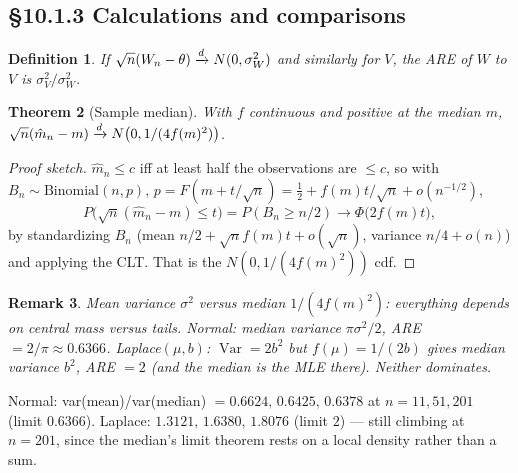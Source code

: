 \documentclass[11pt]{article}
\newtheorem{theorem}{Theorem}[section]
\newtheorem{definition}[theorem]{Definition}
\newtheorem{remark}[theorem]{Remark}
\DeclareMathOperator{\Var}{Var}\DeclareMathOperator{\E}{E}
\begin{document}
\subsection{\S10.1.3 Calculations and comparisons}
\begin{definition}
If $\sqrt n(W_n-\theta)\xrightarrow{d} N(0,\sigma_W^2)$ and similarly for $V$, the ARE of $W$ to $V$ is $\sigma_V^2/\sigma_W^2$.
\end{definition}
\begin{theorem}[Sample median]
With $f$ continuous and positive at the median $m$, $\sqrt n(\hat m_n-m)\xrightarrow{d} N\big(0,1/(4f(m)^2)\big)$.
\end{theorem}
\begin{proof}[Proof sketch]
$\hat m_n\le c$ iff at least half the observations are $\le c$, so with $B_n\sim\mathrm{Binomial}(n,p)$, $p=F(m+t/\sqrt n)=\frac12+f(m)t/\sqrt n+o(n^{-1/2})$,
\[P\big(\sqrt n(\hat m_n-m)\le t\big)=P(B_n\ge n/2)\to\Phi\big(2f(m)t\big),\]
by standardizing $B_n$ (mean $n/2+\sqrt nf(m)t+o(\sqrt n)$, variance $n/4+o(n)$) and applying the CLT. That is the $N(0,1/(4f(m)^2))$ cdf.
\end{proof}
\begin{remark}
Mean variance $\sigma^2$ versus median $1/(4f(m)^2)$: everything depends on central mass versus tails. Normal: median variance $\pi\sigma^2/2$, ARE $=2/\pi\approx0.6366$. Laplace$(\mu,b)$: $\Var=2b^2$ but $f(\mu)=1/(2b)$ gives median variance $b^2$, ARE $=2$ (and the median is the MLE there). Neither dominates.
\end{remark}
\begin{simbox}
Normal: var(mean)/var(median) $=0.6624,\,0.6425,\,0.6378$ at $n=11,51,201$ (limit $0.6366$). Laplace: $1.3121,\,1.6380,\,1.8076$ (limit $2$) --- still climbing at $n=201$, since the median's limit theorem rests on a local density rather than a sum.
\end{simbox}
\end{document}
